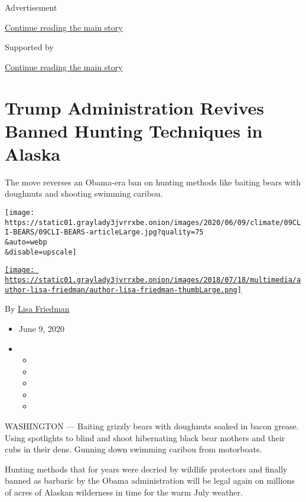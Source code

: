Advertisement

\protect\hyperlink{after-top}{Continue reading the main story}

Supported by

\protect\hyperlink{after-sponsor}{Continue reading the main story}

\hypertarget{trump-administration-revives-banned-hunting-techniques-in-alaska}{%
\section{Trump Administration Revives Banned Hunting Techniques in
Alaska}\label{trump-administration-revives-banned-hunting-techniques-in-alaska}}

The move reverses an Obama-era ban on hunting methods like baiting bears
with doughnuts and shooting swimming caribou.

\texttt{[image: https://static01.graylady3jvrrxbe.onion/images/2020/06/09/climate/09CLI-BEARS/09CLI-BEARS-articleLarge.jpg?quality=75\\\&auto=webp\\\&disable=upscale]}

\href{https://www.nytimes3xbfgragh.onion/by/lisa-friedman}{\texttt{[image: https://static01.graylady3jvrrxbe.onion/images/2018/07/18/multimedia/author-lisa-friedman/author-lisa-friedman-thumbLarge.png]}}

By \href{https://www.nytimes3xbfgragh.onion/by/lisa-friedman}{Lisa
Friedman}

\begin{itemize}
\item
  June 9, 2020
\item
  \begin{itemize}
  \item
  \item
  \item
  \item
  \item
  \end{itemize}
\end{itemize}

WASHINGTON --- Baiting grizzly bears with doughnuts soaked in bacon
grease. Using spotlights to blind and shoot hibernating black bear
mothers and their cubs in their dens. Gunning down swimming caribou from
motorboats.

Hunting methods that for years were decried by wildlife protectors and
finally banned as barbaric by the Obama administration will be legal
again on millions of acres of Alaskan wilderness in time for the warm
July weather.

